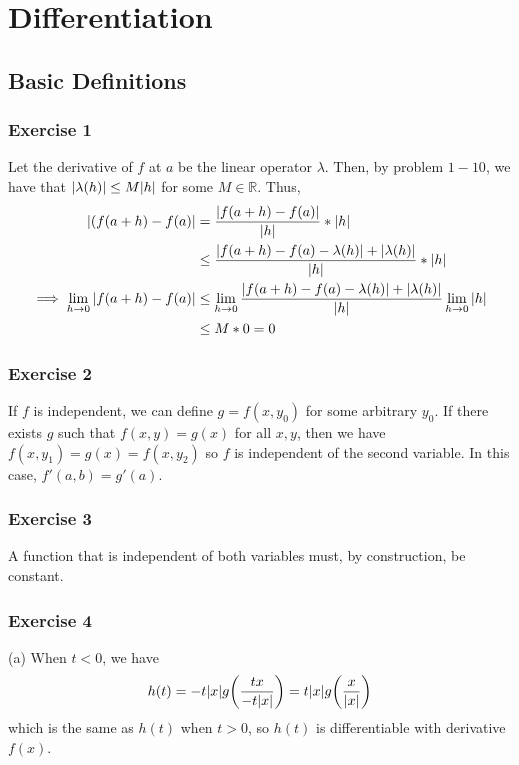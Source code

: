 \section{Differentiation}

\subsection{Basic Definitions}

\subsubsection{Exercise 1}
Let the derivative of $f$ at $a$ be the linear operator $\lambda$. Then, by problem $1-10$, we have that
$\abs{\lambda(h)} \leq M \abs{h}$ for some $M \in \mathbb{R}$. Thus,
\begin{align*}
        \abs{(f(a + h) - f(a)} &= \frac{\abs{f(a + h) - f(a)}}{\abs{h}} * \abs{h} \\
                               &\leq \frac{\abs{f(a + h) - f(a) - \lambda(h)} + \abs{\lambda(h)}}{\abs{h}} * \abs{h} \\
        \implies \lim_{h \to 0} \abs{f(a + h) - f(a)} &\leq \lim_{h \to 0} \frac{\abs{f(a + h) - f(a) - \lambda(h)} + \abs{\lambda(h)}}{\abs{h}} \lim_{h \to 0} \abs{h} \\
                                                      &\leq M * 0 = 0
\end{align*}

\subsubsection{Exercise 2}
If $f$ is independent, we can define $g = f(x, y_0)$ for some arbitrary $y_0$. If there exists $g$ such that
$f(x, y) = g(x)$ for all $x, y$, then we have $f(x, y_1) = g(x) = f(x, y_2)$ so $f$ is independent of the
second variable. In this case, $f'(a, b) = g'(a)$.

\subsubsection{Exercise 3}
A function that is independent of both variables must, by construction, be constant.

\subsubsection{Exercise 4}
(a) When $t < 0$, we have
\begin{align*}
        h(t) = -t\abs{x} g\bigg(\frac{tx}{-t \abs{x}}\bigg) = t\abs{x}g\bigg(\frac{x}{\abs{x}}\bigg)
\end{align*}
which is the same as $h(t)$ when $t > 0$, so $h(t)$ is differentiable with derivative $f(x)$.

